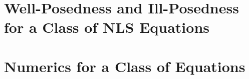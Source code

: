 \documentclass[final, 12pt]{nddiss2e}
\begin{document}

\mainmatter
 

 \chapter{Well-Posedness and Ill-Posedness for a Class of NLS Equations}
 \chapter{Numerics for a Class of Equations}
\appendix


\backmatter              %

\end{document}
